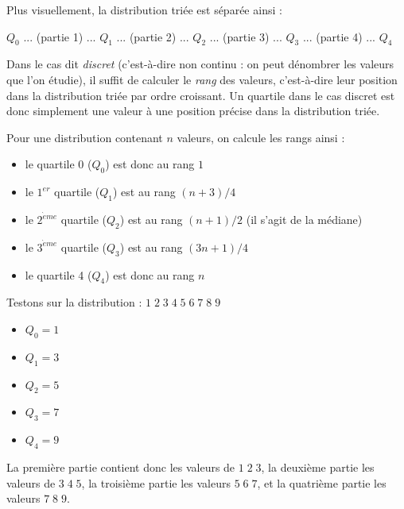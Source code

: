 \documentclass[11pt,a4paper]{article}
\begin{document}
Plus visuellement, la distribution triée est séparée ainsi :

\begin{center}
$ Q_{0} $ ... (partie 1) ... $ Q_{1} $ ... (partie 2) ... $ Q_{2} $ ... (partie 3) ... $ Q_{3} $ ... (partie 4) ... $ Q_{4} $
\end{center}

Dans le cas dit \textit{discret} (c'est-à-dire non continu : on peut dénombrer les valeurs que l'on étudie), il suffit de calculer le \textit{rang} des valeurs, c'est-à-dire leur position dans la distribution triée par ordre croissant.
Un quartile dans le cas discret est donc simplement une valeur à une position précise dans la distribution triée.

\bigskip

Pour une distribution contenant $ n $ valeurs, on calcule les rangs ainsi :

\begin{itemize}
\item le quartile 0 ($Q_{0}$) est donc au rang $ 1 $
\item le $ 1^{er} $ quartile ($Q_{1}$) est au rang $ (n + 3) / 4 $
\item le $ 2^{\grave{e}me} $ quartile ($Q_{2}$) est au rang $ (n + 1) / 2 $ (il s'agit de la médiane)
\item le $ 3^{\grave{e}me} $ quartile ($Q_{3}$) est au rang $ (3n + 1) / 4 $
\item le quartile 4 ($Q_{4}$) est donc au rang $ n $
\end{itemize}

\bigskip

Testons sur la distribution : $ 1 \; 2 \; 3 \; 4 \; 5 \; 6 \; 7 \; 8 \; 9 $

\begin{itemize}
\item $ Q_{0} = 1 $
\item $ Q_{1} = 3 $
\item $ Q_{2} = 5 $
\item $ Q_{3} = 7 $
\item $ Q_{4} = 9 $
\end{itemize}

\bigskip

La première partie contient donc les valeurs de $ 1 \; 2 \; 3 $, la deuxième partie les valeurs de $ 3 \; 4 \; 5 $, la troisième partie les valeurs $ 5 \; 6 \; 7 $, et la quatrième partie les valeurs $ 7 \; 8 \; 9 $.

\smallskip
\end{document}

